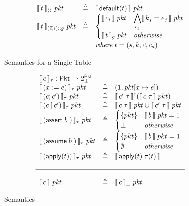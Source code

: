 \begin{figure}[ht]
  \[\begin{array}{lcl}
      \llbracket\,t\,\rrbracket_{\langle\rangle}\; \mathit{pkt}
      &\triangleq& \llbracket\,\mathsf{default}(t)\,\rrbracket\; \mathit{pkt} \\
      \llbracket\, t \,\rrbracket_{(\vec e, i)::g}\; \mathit{pkt}
      &\triangleq& \begin{cases}
        \llbracket\,c_i\,\rrbracket\; \mathit{pkt} & \displaystyle \bigwedge_{e_j} \llbracket\,k_j = e_j\,\rrbracket\; \mathit{pkt} \\
        \llbracket\,t\,\rrbracket_{g}\; \mathit{pkt} & \mathit{otherwise}
      \end{cases}\\
      && \mathit{where}\; t = (s, \vec k, \vec c, c_d)
    \end{array}\]
  \caption{Semantics for a Single Table}
  \label{fig:tablesemantics}
\end{figure}


\begin{figure}[ht]
  \[\begin{array}{lcl}
      \multicolumn 3 l {\bracbb{c}_\tau : \Pkt \rightharpoonup 2^\Pkt_\bot} \\
      \bracbb{(x:=e)}_\tau\; \pkt & \triangleq & (1,\pkt[x \mapsto e]) \\
      \bracbb{(c;c')}_\tau\; \pkt & \triangleq & \bracbb{c'\; \tau}^\dag(\bracbb{c\; \tau}\; pkt) \\
      \bracbb{(c\angel c')}_\tau\; pkt &\triangleq& \bracbb{c\; \tau}\; \pkt \cup \bracbb{c'\; \tau}\; \pkt \\
      \bracbb{(\assert b)}_\tau\; \pkt &\triangleq& \begin{cases}
        \{pkt\}   & \bracbb{b}\; \pkt = \TRUE \\
        \bot & \mathit{otherwise}
      \end{cases} \\
      \bracbb{(\assume b)}_\tau\; \pkt &\triangleq& \begin{cases}
        \{pkt\} & \bracbb{b}\; pkt = \TRUE \\
        \emptyset    & \mathit{otherwise}
      \end{cases} \\
      \bracbb{(\apply t)}_\tau\; \pkt &\triangleq& \bracbb{\apply t\; \tau(t)} \\\\\hline\\
      \bracbb c \; \pkt & \triangleq& \bracbb{c}_\bot\; \pkt

    \end{array}\]
  
  \caption{Semantics}
  \label{fig:semantics}

\end{figure}

